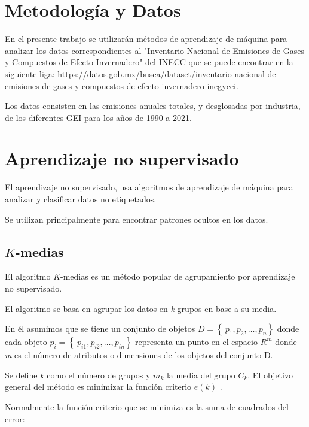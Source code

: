 \documentclass[13.6pt]{article}
\begin{document}
\section{Metodología y Datos} %

En el presente trabajo se utilizarán métodos de aprendizaje de máquina para analizar los datos correspondientes al "Inventario Nacional de Emisiones de Gases y Compuestos de Efecto Invernadero" del INECC que se puede encontrar en la siguiente liga: \href{https://datos.gob.mx/busca/dataset/inventario-nacional-de-emisiones-de-gases-y-compuestos-de-efecto-invernadero-inegycei.}{https://datos.gob.mx/busca/dataset/inventario-nacional-de-emisiones-de-gases-y-compuestos-de-efecto-invernadero-inegycei}.

Los datos consisten en las emisiones anuales totales, y desglosadas por industria, de los diferentes GEI para los años de 1990 a 2021.

\section{Aprendizaje no supervisado}

El aprendizaje no supervisado, usa algoritmos de aprendizaje de máquina para analizar y clasificar datos no etiquetados. 

Se utilizan principalmente para encontrar patrones ocultos en los datos.

\subsection{$K$-medias}

El algoritmo $K$-medias es un método popular de agrupamiento por aprendizaje no supervisado.

El algoritmo se basa en agrupar los datos en \textit{k} grupos en base a su media.

En él asumimos que se tiene un conjunto de objetos $D =\left\lbrace\ p_1, p_2, \ldots, p_n \right\rbrace$ donde cada objeto $p_i =\left\lbrace\ p_{i1}, p_{i2}, \ldots, p_{in} \right\rbrace$ representa un punto en el espacio $R^m$ donde \textit{m} es el número de atributos o dimensiones de los objetos del conjunto D. 

Se define \textit{k} como el número de grupos y $m_k$ la media del grupo $C_k$. El objetivo general del método es minimizar la función criterio $e(k)$ . 

Normalmente la función criterio que se minimiza es la suma de cuadrados del error:
\end{document}
